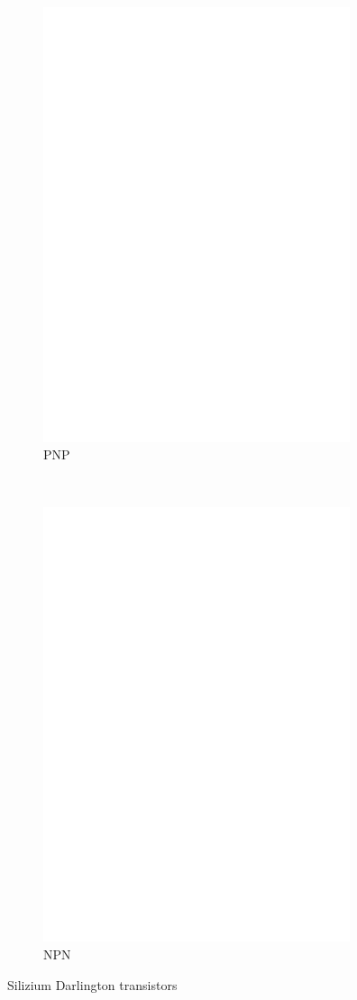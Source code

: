 \begin{figure}[H]
  \begin{subfigure}[b]{9cm}
    \centering
    \includegraphics[width=9cm]{../FIG/BJT_BC516.eps}
    \caption{PNP}
    \label{fig:BJT-PNP-Darl}
  \end{subfigure}
  ~
  \begin{subfigure}[b]{9cm}
    \centering
    \includegraphics[width=9cm]{../FIG/BJT_BC517.eps}
    \caption{NPN}
    \label{fig:BJT-NPN-Darl}
  \end{subfigure}
  \caption{Silizium Darlington transistors}
\end{figure}

